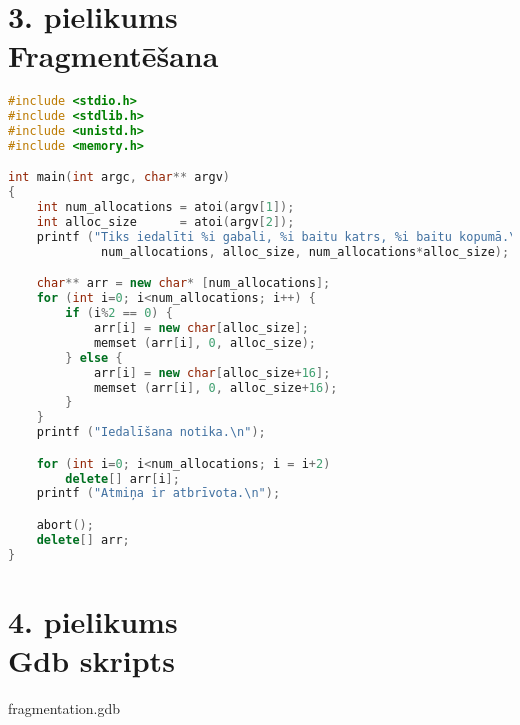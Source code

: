 \newpage
\chapter[3. pielikums. Fragmentēšana] {3. pielikums \\  Fragmentēšana}


\begin{lstlisting}[language=C++]
#include <stdio.h>
#include <stdlib.h>
#include <unistd.h>
#include <memory.h>

int main(int argc, char** argv)
{
	int num_allocations = atoi(argv[1]);
	int alloc_size      = atoi(argv[2]);
	printf ("Tiks iedalīti %i gabali, %i baitu katrs, %i baitu kopumā.\n",
	         num_allocations, alloc_size, num_allocations*alloc_size);

	char** arr = new char* [num_allocations];
	for (int i=0; i<num_allocations; i++) {
		if (i%2 == 0) {
			arr[i] = new char[alloc_size];
			memset (arr[i], 0, alloc_size);
		} else {
			arr[i] = new char[alloc_size+16];
			memset (arr[i], 0, alloc_size+16);
		}
	}
	printf ("Iedalīšana notika.\n");

	for (int i=0; i<num_allocations; i = i+2)
		delete[] arr[i];
	printf ("Atmiņa ir atbrīvota.\n");

	abort();
	delete[] arr;
} 
\end{lstlisting}


\newpage
\chapter[4. pielikums. Gdb skripts] {4. pielikums \\  Gdb skripts}
{fragmentation.gdb}
